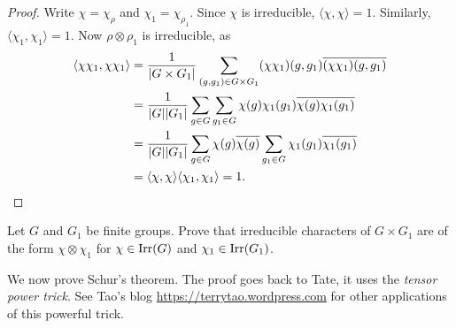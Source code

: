 \begin{proof}
    Write $\chi=\chi_{\rho}$ and $\chi_1=\chi_{\rho_1}$. Since
    $\chi$ is irreducible, $\langle\chi,\chi\rangle=1$. Similarly, 
    $\langle\chi_1,\chi_1\rangle=1$. Now
    $\rho\otimes\rho_1$ is irreducible, as 
    \begin{align*}
    \langle\chi\chi_1,\chi\chi_1\rangle
    &=\frac{1}{|G\times G_1|}\sum_{(g,g_1)\in G\times G_1}(\chi\chi_1)(g,g_1)\overline{(\chi\chi_1)(g,g_1)}\\
    &=\frac{1}{|G||G_1|}\sum_{g\in G}\sum_{g_1\in G}\chi(g)\chi_1(g_1)\overline{\chi(g)}\overline{\chi_1(g_1)}\\
    &=\frac{1}{|G||G_1|}\sum_{g\in G}\chi(g)\overline{\chi(g)}\sum_{g_1\in G}\chi_1(g_1)\overline{\chi_1(g_1)}\\
    &=\langle\chi,\chi\rangle\langle\chi_1,\chi_1\rangle=1.\qedhere 
    \end{align*}
\end{proof}

\begin{exercise}
    Let $G$ and $G_1$ be finite groups. 
    Prove that irreducible characters of $G\times G_1$ 
    are of the form $\chi\otimes\chi_1$ for  
    $\chi\in\operatorname{Irr}(G)$ and $\chi_1\in\operatorname{Irr}(G_1)$. 
\end{exercise}

We now prove Schur's theorem. The proof goes back to Tate, it uses the 
\emph{tensor power trick}. See
Tao's blog  
\url{https://terrytao.wordpress.com} for other applications of this powerful
trick. 

